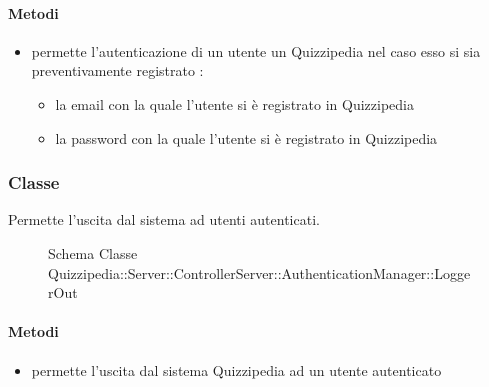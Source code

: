 \paragraph{Metodi}
\begin{itemize}
\item {}
\newline
permette l'autenticazione di un utente un Quizzipedia nel caso esso si sia preventivamente registrato
\newline
{} :
\begin{itemize}
\item {}
\newline
la email con la quale l'utente si è registrato in Quizzipedia
\item {}
\newline
la password con la quale l'utente si è registrato in Quizzipedia
\end{itemize}
\end{itemize}
\subsubsection{Classe }
Permette l'uscita dal sistema ad utenti autenticati.
\begin{figure}[H]
\centering
\noindent{}
\caption[Schema Classe LoggerOut]{Schema Classe Quizzipedia::Server::ControllerServer::AuthenticationManager::LoggerOut}
\end{figure}
\paragraph{Metodi}
\begin{itemize}
\item {}
\newline
permette l'uscita dal sistema Quizzipedia ad un utente autenticato
\newline
\end{itemize}

